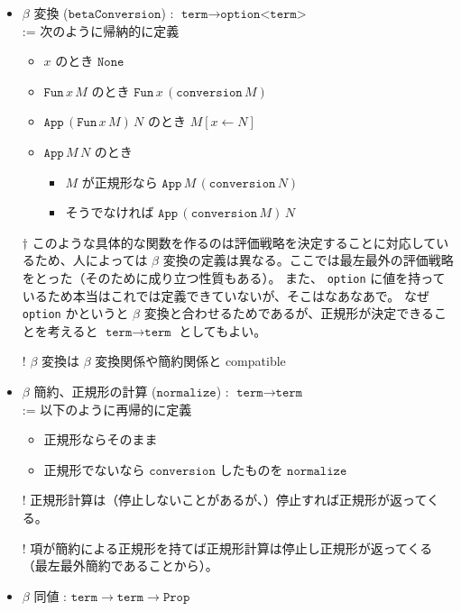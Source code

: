 \documentclass[dvipdfmx]{jsarticle}
\begin{document}
\begin{itemize}
  \item \(\beta\) 変換 (\(\texttt{betaConversion}\)) : \(\texttt{term} \to \texttt{option<term>}\) \\
    := 次のように帰納的に定義
    \begin{itemize}
      \item \(x\) のとき \(\texttt{None}\)
      \item \(\texttt{Fun} \, x \, M\) のとき \(\texttt{Fun} \, x \, (\texttt{conversion} \, M)\)
      \item \(\texttt{App} \, (\texttt{Fun} \, x \, M) \, N\) のとき \(M[x \leftarrow N]\)
      \item \(\texttt{App} \, M \, N\) のとき
        \begin{itemize}
          \item \(M\) が正規形なら \(\texttt{App} \, M \, (\texttt{conversion} \, N)\)
          \item そうでなければ \(\texttt{App} \, (\texttt{conversion} \, M) \, N\)
        \end{itemize}
    \end{itemize}
  \item[\(\dagger\)] このような具体的な関数を作るのは評価戦略を決定することに対応しているため、人によっては \(\beta\) 変換の定義は異なる。ここでは最左最外の評価戦略をとった（そのために成り立つ性質もある）。
  また、 \texttt{option} に値を持っているため本当はこれでは定義できていないが、そこはなあなあで。
  なぜ \texttt{option} かというと \(\beta\) 変換と合わせるためであるが、正規形が決定できることを考えると \(\texttt{term} \to \texttt{term}\) としてもよい。
  \item[!] \(\beta\) 変換は \(\beta\) 変換関係や簡約関係と compatible
  \item \(\beta\) 簡約、正規形の計算 (\(\texttt{normalize}\)) : \(\texttt{term} \to \texttt{term}\) \\
    := 以下のように再帰的に定義
      \begin{itemize}
        \item 正規形ならそのまま
        \item 正規形でないなら \(\texttt{conversion}\) したものを \(\texttt{normalize}\)
      \end{itemize}
  \item[!] 正規形計算は（停止しないことがあるが、）停止すれば正規形が返ってくる。
  \item[!] 項が簡約による正規形を持てば正規形計算は停止し正規形が返ってくる（最左最外簡約であることから）。
  \item \(\beta\) 同値 : \(\texttt{term} \to \texttt{term} \to \texttt{Prop}\) \\

\end{itemize}
\end{document}
